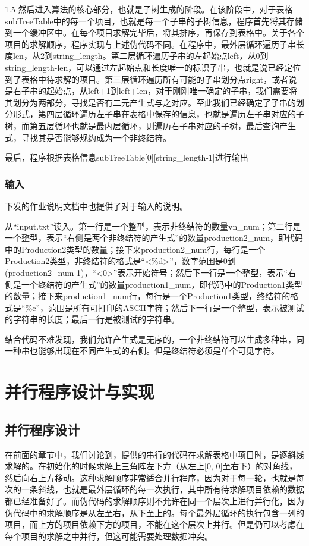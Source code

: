 \documentclass[zihao=-4]{ctexart}
\begin{document}
\begin{spacing}{1.5}
然后进入算法的核心部分，也就是子树生成的阶段。在该阶段中，对于表格subTreeTable中的每一个项目，也就是每一个子串的子树信息，程序首先将其存储到一个缓冲区中。在每个项目求解完毕后，将其排序，再保存到表格中。关于各个项目的求解顺序，程序实现与上述伪代码不同。在程序中，最外层循环遍历子串长度len，从2到string\_length。第二层循环遍历子串的左起始点left，从0到string\_length-len，可以通过左起始点和长度唯一的标识子串，也就是说已经定位到了表格中待求解的项目。第三层循环遍历所有可能的子串划分点right，或者说是右子串的起始点，从left+1到left+len，对于刚刚唯一确定的子串，我们需要将其划分为两部分，寻找是否有二元产生式与之对应。至此我们已经确定了子串的划分形式，第四层循环遍历左子串在表格中保存的信息，也就是遍历左子串对应的子树，而第五层循环也就是最内层循环，则遍历右子串对应的子树，最后查询产生式，寻找其是否能够规约成为一个非终结符。

最后，程序根据表格信息subTreeTable[0][string\_length-1]进行输出

\subsubsection{输入}

下发的作业说明文档中也提供了对于输入的说明。

从“input.txt”读入。第一行是一个整型，表示非终结符的数量vn\_num；第二行是一个整型，表示“右侧是两个非终结符的产生式”的数量production2\_num，即代码中的Production2类型的数量；接下来production2\_num行，每行是一个Production2类型，非终结符的格式是“<\%d>”，数字范围是0到(production2\_num-1)，“<0>”表示开始符号；然后下一行是一个整型，表示“右侧是一个终结符的产生式”的数量production1\_num，即代码中的Production1类型的数量；接下来production1\_num行，每行是一个Production1类型，终结符的格式是“\%c”，范围是所有可打印的ASCII字符；然后下一行是一个整型，表示被测试的字符串的长度；最后一行是被测试的字符串。

结合代码不难发现，我们允许产生式是无序的，一个非终结符可以生成多种串，同一种串也能够出现在不同产生式的右侧。但是终结符必须是单个可见字符。

\section{并行程序设计与实现}

\subsection{并行程序设计}

在前面的章节中，我们讨论到，提供的串行的代码在求解表格中项目时，是逐斜线求解的。在初始化的时候求解上三角阵左下方（从左上[0, 0]至右下）的对角线，然后向右上方移动。这种求解顺序非常适合并行程序，因为对于每一轮，也就是每次的一条斜线，也就是最外层循环的每一次执行，其中所有待求解项目依赖的数据都已经准备好了。而伪代码的求解顺序则不允许在同一个层次上进行并行化，因为伪代码中的求解顺序是从左至右，从下至上的。每个最外层循环的执行包含一列的项目，而上方的项目依赖下方的项目，不能在这个层次上并行。但是仍可以考虑在每个项目的求解之中并行，但这可能需要处理数据冲突。


\end{spacing}
\end{document}
